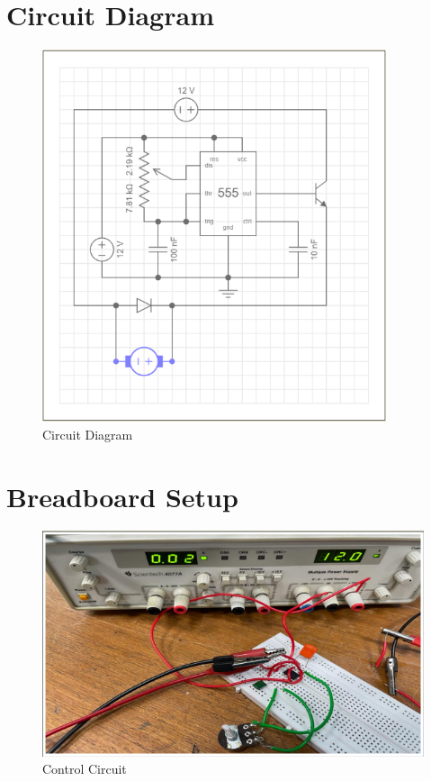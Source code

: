 \documentclass{article}
\begin{document}
\section{Circuit Diagram}
\begin{figure}[h!]
    \centering
    \includegraphics[width=0.9\textwidth]{pic2.png}
    \caption{Circuit Diagram}
\end{figure}
\newpage
\section{Breadboard Setup}
\begin{figure}[h!]
    \centering
    \includegraphics[width=1\textwidth]{pic3.png}
    \caption{Control Circuit}
\end{figure}
\end{document}
